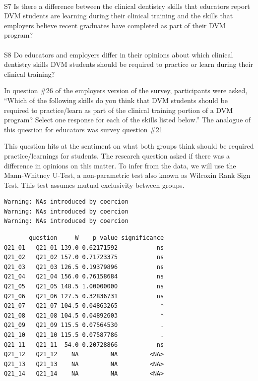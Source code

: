 \documentclass[
  11pt,
  letterpaper,
  DIV=11,
  numbers=noendperiod]{scrartcl}
\makeatletter
\let\oldparagraph\paragraph
\renewcommand{\paragraph}{
    \@ifstar
      \xxxParagraphStar
      \xxxParagraphNoStar
  }
\newcommand{\xxxParagraphStar}[1]{\oldparagraph*{#1}\mbox{}}
\newcommand{\xxxParagraphNoStar}[1]{\oldparagraph{#1}\mbox{}}
\makeatother
\begin{document}
\paragraph{S7 Is there a difference between the clinical dentistry
skills that educators report DVM students are learning during their
clinical training and the skills that employers believe recent graduates
have completed as part of their DVM
program?}\label{s7-is-there-a-difference-between-the-clinical-dentistry-skills-that-educators-report-dvm-students-are-learning-during-their-clinical-training-and-the-skills-that-employers-believe-recent-graduates-have-completed-as-part-of-their-dvm-program}

\paragraph{S8 Do educators and employers differ in their opinions about
which clinical dentistry skills DVM students should be required to
practice or learn during their clinical
training?}\label{s8-do-educators-and-employers-differ-in-their-opinions-about-which-clinical-dentistry-skills-dvm-students-should-be-required-to-practice-or-learn-during-their-clinical-training}

In question \#26 of the employers version of the survey, participants
were asked, ``Which of the following skills do you think that DVM
students should be required to practice/learn as part of the clinical
training portion of a DVM program? Select one response for each of the
skills listed below.'' The analogue of this question for educators was
survey question \#21

This question hits at the sentiment on what both groups think should be
required practice/learnings for students. The research question asked if
there was a difference in opinions on this matter. To infer from the
data, we will use the Mann-Whitney U-Test, a non-parametric test also
known as Wilcoxin Rank Sign Test. This test assumes mutual exclusivity
between groups.

\begin{verbatim}
Warning: NAs introduced by coercion
Warning: NAs introduced by coercion
Warning: NAs introduced by coercion
\end{verbatim}

\begin{verbatim}
       question     W    p_value significance
Q21_01   Q21_01 139.0 0.62171592           ns
Q21_02   Q21_02 157.0 0.71723375           ns
Q21_03   Q21_03 126.5 0.19379896           ns
Q21_04   Q21_04 156.0 0.76158684           ns
Q21_05   Q21_05 148.5 1.00000000           ns
Q21_06   Q21_06 127.5 0.32836731           ns
Q21_07   Q21_07 104.5 0.04863265            *
Q21_08   Q21_08 104.5 0.04892603            *
Q21_09   Q21_09 115.5 0.07564530            .
Q21_10   Q21_10 115.5 0.07587786            .
Q21_11   Q21_11  54.0 0.20728866           ns
Q21_12   Q21_12    NA         NA         <NA>
Q21_13   Q21_13    NA         NA         <NA>
Q21_14   Q21_14    NA         NA         <NA>
\end{verbatim}
\end{document}
